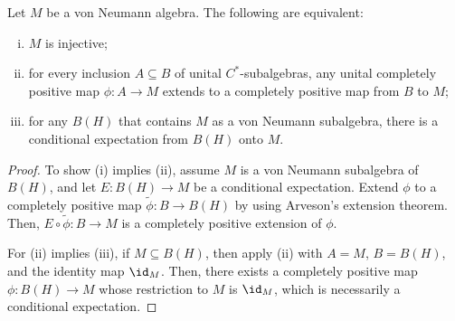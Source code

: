\documentclass[10pt]{mypackage}
\begin{document}
\begin{proposition}
  Let $M$ be a von Neumann algebra. The following are equivalent:
  \begin{enumerate}[(i)]
    \item $M$ is injective;
    \item for every inclusion $A\subseteq B$ of unital $C^{\ast}$-subalgebras, any unital completely positive map $\phi\colon A\rightarrow M$ extends to a completely positive map from $B$ to $M$;
    \item for any $B(H)$ that contains $M$ as a von Neumann subalgebra, there is a conditional expectation from $B(H)$ onto $M$.
  \end{enumerate}
\end{proposition}
\begin{proof}
  To show (i) implies (ii), assume $M$ is a von Neumann subalgebra of $B(H)$, and let $E\colon B(H)\rightarrow M$ be a conditional expectation. Extend $\phi$ to a completely positive map $ \widetilde{\phi}\colon B\rightarrow B(H) $ by using Arveson's extension theorem. Then, $E\circ \widetilde{\phi}\colon B\rightarrow M$ is a completely positive extension of $\phi$.

  For (ii) implies (iii), if $M\subseteq B(H)$, then apply (ii) with $A = M$, $B = B(H)$, and the identity map $\id_M$. Then, there exists a completely positive map $\phi\colon B(H)\rightarrow M$ whose restriction to $M$ is $\id_M$, which is necessarily a conditional expectation.
\end{proof}
\end{document}

